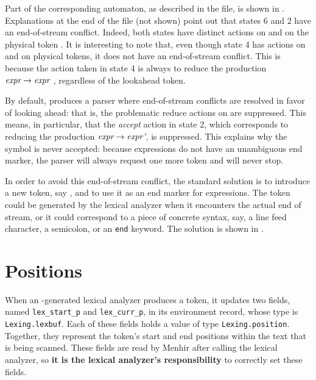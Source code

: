 \documentclass[onecolumn,11pt,nocopyrightspace,preprint]{sigplanconf}
\begin{document}
Part of the corresponding automaton, as described in the \automaton file, is
shown in . Explanations at the end of the \automaton
file (not shown) point out that states 6 and 2 have an end-of-stream
conflict. Indeed, both states have distinct actions on \eos and on the
physical token .
%
It is interesting to note that, even though state 4 has actions on \eos and on
physical tokens, it does not have an end-of-stream conflict. This is because
the action taken in state 4 is always to reduce the production $\textit{expr}
\rightarrow \textit{expr}$  , regardless of the lookahead
token.

By default, \menhir produces a parser where end-of-stream conflicts are
resolved in favor of looking ahead: that is, the problematic reduce actions on
\eos are suppressed. This means, in particular, that the \emph{accept} action
in state 2, which corresponds to reducing the production $\textit{expr}
\rightarrow \textit{expr'}$, is suppressed. This explains why the symbol 
is never accepted: because expressions do not have an unambiguous end marker,
the parser will always request one more token and will never stop.

In order to avoid this end-of-stream conflict, the standard solution is to
introduce a new token, say , and to use it as an end marker for
expressions. The  token could be generated by the lexical analyzer
when it encounters the actual end of stream, or it could correspond to a piece
of concrete syntax, say, a line feed character, a semicolon, or an
\texttt{end} keyword. The solution is shown in .


\section{Positions}
\label{sec:positions}

When an \ocamllex-generated lexical analyzer produces a token, it updates
two fields, named \verb+lex_start_p+ and \verb+lex_curr_p+, in its environment
record, whose type is \verb+Lexing.lexbuf+. Each of these fields holds a value
of type \verb+Lexing.position+. Together, they represent the token's start and
end positions within the text that is being scanned. These fields are read by
Menhir after calling the lexical analyzer, so \textbf{it is the lexical
  analyzer's responsibility} to correctly set these fields.
\end{document}
